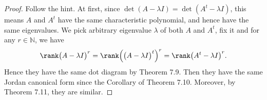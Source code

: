 \begin{Exercise}
\begin{proof}
Follow the hint. 
At first, since $\det(A-\lambda I) = \det(A^t - \lambda I)$, this means $A$ and $A^t$ have the same characteristic polynomial, and hence have the same eigenvalues. 
We pick arbitrary eigenvalue $\lambda$ of both $A$ and $A^t$, fix it and for any $r\in\mathbb{N}$, we have
$$
\rank\big(A-\lambda I\big)^r 
= \rank\Big(\big(A-\lambda I\big)^t\Big)^r
= \rank\big(A^t - \lambda I\big)^r.
$$
Hence they have the same dot diagram by Theorem 7.9. 
Then they have the same Jordan canonical form since the Corollary of Theorem 7.10. 
Moreover, by Theorem 7.11, they are similar.
\end{proof}
\end{Exercise}